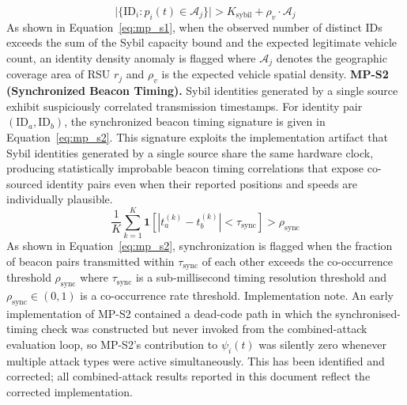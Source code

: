 \documentclass[12pt, a4paper]{report}
\begin{document}
\begin{equation}
  \bigl|\{\mathrm{ID}_i : p_i(t) \in \mathcal{A}_j\}\bigr|
  > K_{\mathrm{sybil}} + \rho_v \cdot \mathcal{A}_j
  \label{eq:mp_s1}
\end{equation}
As shown in
Equation~\ref{eq:mp_s1}, when the observed number of distinct IDs
exceeds the sum of the Sybil capacity bound and the expected legitimate
vehicle count, an identity density anomaly is flagged where $\mathcal{A}_j$ denotes the geographic coverage area of RSU $r_j$
and $\rho_v$ is the expected vehicle spatial density.
\newline
\newline
\textbf{MP-S2 (Synchronized Beacon Timing).}
Sybil identities generated by a single source exhibit suspiciously
correlated transmission timestamps. For identity pair
$(\mathrm{ID}_a, \mathrm{ID}_b)$, the synchronized beacon timing
signature is given in Equation~\ref{eq:mp_s2}.
\newline
\newline
This signature exploits the implementation artifact that Sybil
identities generated by a single source share the same hardware clock,
producing statistically improbable beacon timing correlations that
expose co-sourced identity pairs even when their reported positions
and speeds are individually plausible.
\begin{equation}
  \frac{1}{K}\sum_{k=1}^{K}
  \mathbf{1}\!\left[|t_a^{(k)} - t_b^{(k)}| < \tau_{\mathrm{sync}}\right]
  > \rho_{\mathrm{sync}}
  \label{eq:mp_s2}
\end{equation}
As shown in Equation~\ref{eq:mp_s2}, synchronization
is flagged when the fraction of beacon pairs transmitted within
$\tau_{\mathrm{sync}}$ of each other exceeds the co-occurrence
threshold $\rho_{\mathrm{sync}}$ where $\tau_{\mathrm{sync}}$ is a sub-millisecond timing resolution
threshold and $\rho_{\mathrm{sync}} \in (0,1)$ is a co-occurrence
rate threshold.
\newline
\newline
Implementation note. An early implementation of MP-S2 contained
a dead-code path in which the synchronised-timing check was
constructed but never invoked from the combined-attack evaluation
loop, so MP-S2's contribution to $\psi_i(t)$ was silently zero
whenever multiple attack types were active simultaneously. This has
been identified and corrected; all combined-attack results reported
in this document reflect the corrected implementation.
\newline
\newline
\end{document}
